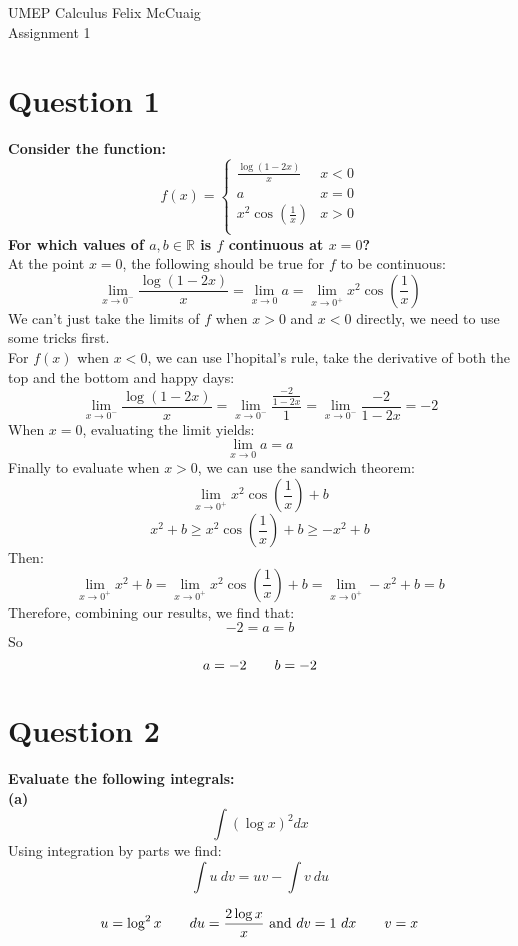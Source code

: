 \documentclass[12pt]{article}
\begin{document}
UMEP Calculus \hfill Felix McCuaig \\
Assignment 1

\section*{Question 1}
\textbf{Consider the function:}
$$
f(x)= 
\begin{cases}
 \frac{\log(1-2x)}{x} & x < 0 \\
 a & x = 0 \\
 x^2\cos\left( \frac{1}{x}\right) & x > 0 \\
\end{cases}
$$
\textbf{For which values of $a, b \in \mathbb{R}$ is $f$ continuous at $x=0$?}\\
\medskip
At the point $x=0$, the following should be true for $f$ to be continuous:\\
$$
\lim_{x\rightarrow 0^-}\frac{\log(1-2x)}{x}=\lim_{x\rightarrow 0}a=\lim_{x\rightarrow 0^+}x^2\cos\left( \frac{1}{x} \right)
$$
We can't just take the limits of $f$ when $x>0$ and $x<0$ directly, we need to use some tricks first.\\
\smallskip
For $f(x)$ when $x<0$, we can use l'hopital's rule, take the derivative of both the top and the bottom and happy days:
$$
\lim_{x \rightarrow 0^-}\frac{\log(1-2x)}{x}=\lim_{x \rightarrow 0^-}\frac{\frac{-2}{1-2x}}{1}=\lim_{x \rightarrow 0^-}\frac{-2}{1-2x}=-2
$$ 
When $x=0$, evaluating the limit yields:
$$
\lim_{x\rightarrow 0}a=a
$$
Finally to evaluate when $x>0$, we can use the sandwich theorem:
$$
\lim_{x \rightarrow 0^+}x^2\cos \left( \frac{1}{x} \right)+b
$$ 
$$
x^2+b \geq x^2\cos \left( \frac{1}{x} \right)+b \geq -x^2+b
$$
Then:
$$
\lim_{x \rightarrow 0^+}x^2+b=\lim_{x \rightarrow 0^+}x^2\cos \left( \frac{1}{x} \right)+b=\lim_{x \rightarrow 0^+}-x^2+b=b
$$
Therefore, combining our results, we find that:
$$
-2=a=b
$$
So
$$
a = -2 \hspace{20px} b = -2
$$
\section*{Question 2}
\textbf{Evaluate the following integrals:}\\
\medskip
\textbf{(a)}\\
$$
\int (\log x)^2 dx
$$
Using integration by parts we find:\\
$$
\int u \ dv = uv - \int v \ du
$$

$$
u=\log^2 x \hspace{20px} du=\frac{2\log x}{x} \text{ and } dv=1 \ dx \hspace{20px} v=x
$$
\end{document}
